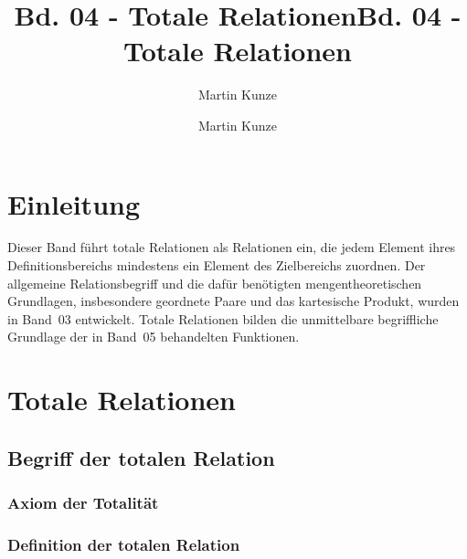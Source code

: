 \documentclass[main.tex]{subfiles}
\title{Bd. 04 - Totale Relationen}
\author{Martin Kunze}
\date{}
\begin{document}
\title{Bd. 04 - Totale Relationen}
\author{Martin Kunze}
\date{}
\hypersetup{pageanchor=false}
\maketitle
\hypersetup{pageanchor=true}
\setcounter{tocdepth}{3}
\tableofcontents
\setcounter{file}{4}
\renewcommand{\FormulaBandID}{4}

\chapter{Einleitung}

Dieser Band führt totale Relationen als Relationen ein, die jedem Element
ihres Definitionsbereichs mindestens ein Element des Zielbereichs zuordnen.
Der allgemeine Relationsbegriff und die dafür benötigten mengentheoretischen
Grundlagen, insbesondere geordnete Paare und das kartesische Produkt, wurden
in Band~03 entwickelt. Totale Relationen bilden die unmittelbare begriffliche
Grundlage der in Band~05 behandelten Funktionen.

\chapter{Totale Relationen}

\section{Begriff der totalen Relation}

\subsection{Axiom der Totalität}

{
}

\subsection{Definition der totalen Relation}

\end{document}

